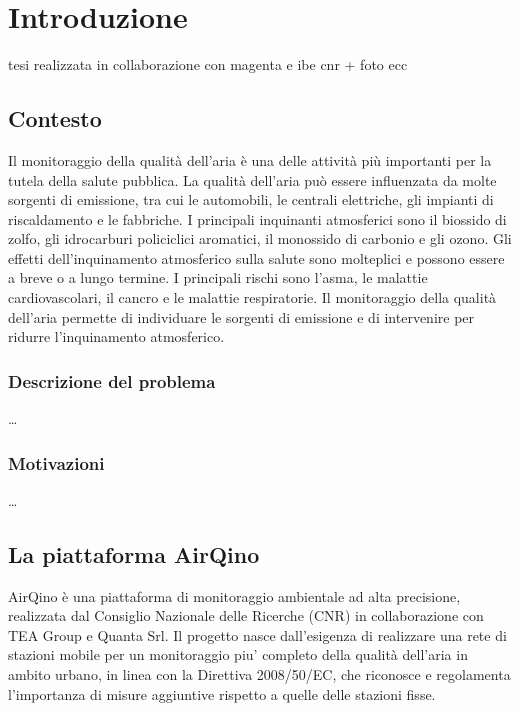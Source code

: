 \chapter{Introduzione}\label{ch:introduzione}
tesi realizzata in collaborazione con magenta e ibe cnr + foto ecc

\section{Contesto}\label{sec:contesto}


Il monitoraggio della qualità dell'aria è una delle attività più importanti per la tutela della salute pubblica. La qualità dell'aria può essere influenzata da molte sorgenti di emissione, tra cui le automobili, le centrali elettriche, gli impianti di riscaldamento e le fabbriche. I principali inquinanti atmosferici sono il biossido di zolfo, gli idrocarburi policiclici aromatici, il monossido di carbonio e gli ozono. Gli effetti dell'inquinamento atmosferico sulla salute sono molteplici e possono essere a breve o a lungo termine. I principali rischi sono l'asma, le malattie cardiovascolari, il cancro e le malattie respiratorie. Il monitoraggio della qualità dell'aria permette di individuare le sorgenti di emissione e di intervenire per ridurre l'inquinamento atmosferico.

\subsection{Descrizione del problema}\label{ssec:problema}
\ldots

\subsection{Motivazioni}\label{ssec:motivazoni}
\ldots

\section{La piattaforma AirQino}\label{sec:airqino}
AirQino è una piattaforma di monitoraggio ambientale ad alta precisione, realizzata dal Consiglio Nazionale delle Ricerche (CNR) in collaborazione con TEA Group e Quanta Srl. \cite{GUALTIERI2017609}
Il progetto nasce dall’esigenza di realizzare una rete di stazioni mobile per un monitoraggio piu’ completo della qualità dell’aria in ambito urbano, in linea con la Direttiva 2008/50/EC, che riconosce e regolamenta l’importanza di misure aggiuntive rispetto a quelle delle stazioni fisse.


